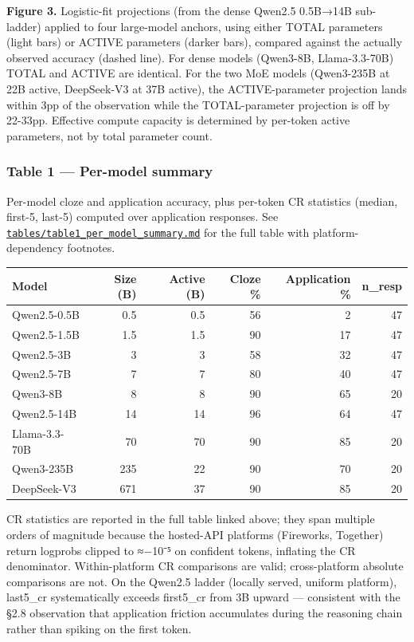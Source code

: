 \documentclass[
]{article}
\newcounter{none} %
\begin{document}
\textbf{Figure 3.} Logistic-fit projections (from the dense Qwen2.5
0.5B→14B sub-ladder) applied to four large-model anchors, using either
TOTAL parameters (light bars) or ACTIVE parameters (darker bars),
compared against the actually observed accuracy (dashed line). For dense
models (Qwen3-8B, Llama-3.3-70B) TOTAL and ACTIVE are identical. For the
two MoE models (Qwen3-235B at 22B active, DeepSeek-V3 at 37B active),
the ACTIVE-parameter projection lands within 3pp of the observation
while the TOTAL-parameter projection is off by 22-33pp. Effective
compute capacity is determined by per-token active parameters, not by
total parameter count.

\subsubsection{Table 1 --- Per-model
summary}\label{table-1-per-model-summary}

Per-model cloze and application accuracy, plus per-token CR statistics
(median, first-5, last-5) computed over application responses. See
\href{tables/table1_per_model_summary.md}{\texttt{tables/table1\_per\_model\_summary.md}}
for the full table with platform-dependency footnotes.

{\def\LTcaptype{none} %
\begin{longtable}[]{@{}lrrrrr@{}}
\toprule\noalign{}
Model & Size (B) & Active (B) & Cloze \% & Application \% & n\_resp \\
\midrule\noalign{}
\endhead
\bottomrule\noalign{}
\endlastfoot
Qwen2.5-0.5B & 0.5 & 0.5 & 56 & 2 & 47 \\
Qwen2.5-1.5B & 1.5 & 1.5 & 90 & 17 & 47 \\
Qwen2.5-3B & 3 & 3 & 58 & 32 & 47 \\
Qwen2.5-7B & 7 & 7 & 80 & 40 & 47 \\
Qwen3-8B & 8 & 8 & 90 & 65 & 20 \\
Qwen2.5-14B & 14 & 14 & 96 & 64 & 47 \\
Llama-3.3-70B & 70 & 70 & 90 & 85 & 20 \\
Qwen3-235B & 235 & 22 & 90 & 70 & 20 \\
DeepSeek-V3 & 671 & 37 & 90 & 85 & 20 \\
\end{longtable}
}

CR statistics are reported in the full table linked above; they span
multiple orders of magnitude because the hosted-API platforms
(Fireworks, Together) return logprobs clipped to ≈−10⁻⁵ on confident
tokens, inflating the CR denominator. Within-platform CR comparisons are
valid; cross-platform absolute comparisons are not. On the Qwen2.5
ladder (locally served, uniform platform), last5\_cr systematically
exceeds first5\_cr from 3B upward --- consistent with the §2.8
observation that application friction accumulates during the reasoning
chain rather than spiking on the first token.
\end{document}
